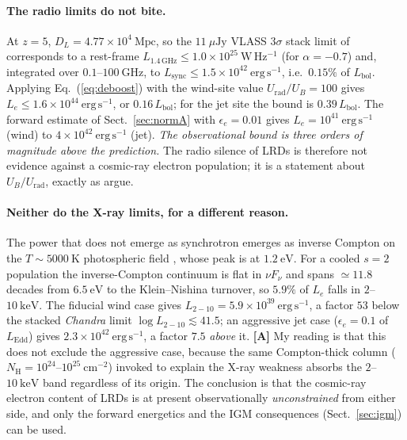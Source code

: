 \documentclass[11pt,a4paper]{article}
\newcommand{\ergs}{\ \mathrm{erg\,s^{-1}}}
\begin{document}
\paragraph{The radio limits do not bite.} At $z=5$,
$D_L=4.77\times10^{4}\ \mathrm{Mpc}$, so the $11\ \mu\mathrm{Jy}$ VLASS
$3\sigma$ stack limit of \citet{Perger2025} corresponds to a rest-frame
$L_{1.4\,\mathrm{GHz}}\le1.0\times10^{25}\ \mathrm{W\,Hz^{-1}}$ (for
$\alpha=-0.7$) and, integrated over $0.1$--$100\ \mathrm{GHz}$, to
$L_{\mathrm{sync}}\le1.5\times10^{42}\ergs$, i.e.\ $0.15\%$ of $L_{\mathrm{bol}}$.
Applying Eq.~(\ref{eq:deboost}) with the wind-site value
$U_{\mathrm{rad}}/U_B=100$ gives $L_e\le1.6\times10^{44}\ergs$, or $0.16\,
L_{\mathrm{bol}}$; for the jet site the bound is $0.39\,L_{\mathrm{bol}}$. The
forward estimate of Sect.~\ref{sec:normA} with $\epsilon_e=0.01$ gives
$L_e=10^{41}\ergs$ (wind) to $4\times10^{42}\ergs$ (jet). \emph{The
observational bound is three orders of magnitude above the prediction.} The
radio silence of LRDs is therefore not evidence against a cosmic-ray electron
population; it is a statement about $U_B/U_{\mathrm{rad}}$, exactly as
\citet{Rodriguez2026} argue.

\paragraph{Neither do the X-ray limits, for a different reason.} The power that
does not emerge as synchrotron emerges as inverse Compton on the
$T\sim5000\ \mathrm{K}$ photospheric field \citep{Gentile2026}, whose peak is at
$1.2\ \mathrm{eV}$. For a cooled $s=2$ population the inverse-Compton continuum
is flat in $\nu F_\nu$ and spans $\simeq11.8$ decades from $6.5\ \mathrm{eV}$ to
the Klein--Nishina turnover, so $5.9\%$ of $L_e$ falls in $2$--$10\ \mathrm{keV}$.
The fiducial wind case gives $L_{2-10}=5.9\times10^{39}\ergs$, a factor $53$
below the stacked \emph{Chandra} limit $\log L_{2-10}\lesssim41.5$; an
aggressive jet case ($\epsilon_e=0.1$ of $L_{\mathrm{Edd}}$) gives
$2.3\times10^{42}\ergs$, a factor $7.5$ \emph{above} it. \textbf{[A]} My reading
is that this does not exclude the aggressive case, because the same
Compton-thick column ($N_{\mathrm H}=10^{24}$--$10^{25}\ \mathrm{cm^{-2}}$)
invoked to explain the X-ray weakness \citep{Tortosa2026,Pacucci2026} absorbs
the $2$--$10\ \mathrm{keV}$ band regardless of its origin. The conclusion is
that the cosmic-ray electron content of LRDs is at present observationally
\emph{unconstrained} from either side, and only the forward energetics and the
IGM consequences (Sect.~\ref{sec:igm}) can be used.
\end{document}

